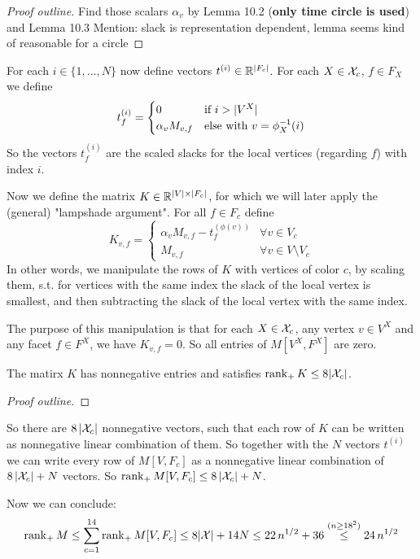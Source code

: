 \begin{proof}[Proof outline]
  Find those scalars $\alpha_v$ by Lemma 10.2 (\textbf{only time circle is used}) and Lemma 10.3
  Mention: slack is representation dependent, lemma seems kind of reasonable for a circle
\end{proof}

For each $i \in \{1,\dots,N\}$ now define vectors $t^{(i)} \in \mathbb{R}^{\lvert F_c\rvert}$.
For each $X \in \mathcal{X}_c$, $f \in F_X$ we define
\begin{equation*}
  t_f^{(i)} = 
  \begin{cases}
    0 &\text{if } i > \lvert V^X\rvert\\
    \alpha_v M_{v,f} &\text{else with } v = \phi_X^{-1}(i)
  \end{cases}
\end{equation*}
So the vectors $t_f^{(i)}$ are the scaled slacks for the local vertices (regarding $f$) with index $i$.

Now we define the matrix $K \in \mathbb{R}^{\lvert V\rvert \times \lvert F_c\rvert}$, for which we will later apply the (general) "lampshade argument". For all $f \in F_c$ define
\begin{equation*}
  K_{v,f} = 
  \begin{cases}
    \alpha_v M_{v,f} - t_f^{(\phi(v))} & \forall v \in V_c\\
    M_{v,f} & \forall v \in V \setminus V_c
  \end{cases}
\end{equation*}
In other words, we manipulate the rows of $K$ with vertices of color $c$, by scaling them, s.t. for vertices with the same index the slack of the local vertex is smallest, and then subtracting the slack of the local vertex with the same index.

The purpose of this manipulation is that for each $X \in \mathcal{X}_c$, any vertex $v \in V^X$ and any facet $f \in F^X$, we have $K_{v,f} = 0$. So all entries of $M[V^X, F^X]$ are zero.

\begin{lemma}
  The matirx $K$ has nonnegative entries and satisfies $\operatorname{rank}_+ K \leq 8\lvert\mathcal{X}_c\rvert$.
\end{lemma}

\begin{proof}[Proof outline]
\end{proof}

So there are $8\,\lvert\mathcal{X}_c\rvert$ nonnegative vectors, such that each row of $K$ can be written as nonnegative linear combination of them. So together with the $N$ vectors $t^{(i)}$ we can write every row of $M[V,F_c]$ as a nonnegative linear combination of $8\,\lvert\mathcal{X}_c\rvert + N$ vectors. So $\operatorname{rank}_+ M[V,F_c] \leq 8\,\lvert\mathcal{X}_c\rvert + N$.

Now we can conclude: $$\operatorname{rank}_+ M \leq \sum_{c=1}^{14} \operatorname{rank}_+ M[V,F_c] \leq 8\lvert\mathcal{X}\rvert + 14N \leq 22\,n^{1/2} + 36 \stackrel{(n \geq 18^2)}{\leq} 24\,n^{1/2}$$
